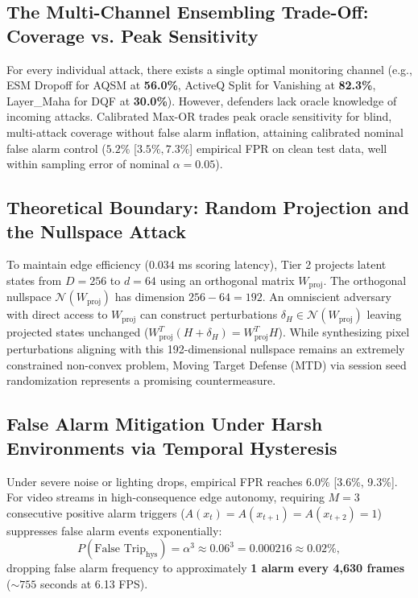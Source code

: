 \documentclass[preprint,12pt]{elsarticle}
\begin{document}
\subsection{The Multi-Channel Ensembling Trade-Off: Coverage vs. Peak Sensitivity}
For every individual attack, there exists a single optimal monitoring channel (e.g., ESM Dropoff for AQSM at \textbf{56.0\%}, ActiveQ Split for Vanishing at \textbf{82.3\%}, Layer\_Maha for DQF at \textbf{30.0\%}). However, defenders lack oracle knowledge of incoming attacks. Calibrated Max-OR trades peak oracle sensitivity for blind, multi-attack coverage without false alarm inflation, attaining calibrated nominal false alarm control ($5.2\%$ [$3.5\%, 7.3\%$] empirical FPR on clean test data, well within sampling error of nominal $\alpha=0.05$).

\subsection{Theoretical Boundary: Random Projection and the Nullspace Attack}
To maintain edge efficiency ($0.034$ ms scoring latency), Tier 2 projects latent states from $D=256$ to $d=64$ using an orthogonal matrix $W_{\mathrm{proj}}$. The orthogonal nullspace $\mathcal{N}(W_{\mathrm{proj}})$ has dimension $256 - 64 = 192$. An omniscient adversary with direct access to $W_{\mathrm{proj}}$ can construct perturbations $\delta_H \in \mathcal{N}(W_{\mathrm{proj}})$ leaving projected states unchanged ($W_{\mathrm{proj}}^T (H + \delta_H) = W_{\mathrm{proj}}^T H$). While synthesizing pixel perturbations aligning with this 192-dimensional nullspace remains an extremely constrained non-convex problem, Moving Target Defense (MTD) via session seed randomization represents a promising countermeasure.

\subsection{False Alarm Mitigation Under Harsh Environments via Temporal Hysteresis}
Under severe noise or lighting drops, empirical FPR reaches $6.0\%$ [3.6\%, 9.3\%]. For video streams in high-consequence edge autonomy, requiring $M=3$ consecutive positive alarm triggers ($A(x_t) = A(x_{t+1}) = A(x_{t+2}) = 1$) suppresses false alarm events exponentially:
\begin{equation}
P(\text{False Trip}_{\mathrm{hys}}) = \alpha^3 \approx 0.06^3 = 0.000216 \approx 0.02\%,
\end{equation}
dropping false alarm frequency to approximately \textbf{1 alarm every 4,630 frames} ($\sim 755$ seconds at 6.13 FPS).
\end{document}
